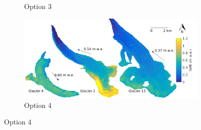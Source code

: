 \documentclass{sfuthesis}
\begin{document}
\begin{figure}[H]
\begin{subfigure}[b]{0.475\textwidth}
            \caption[]%
            {{\small Option 3}}    
        \end{subfigure}
        \quad
        \begin{subfigure}[b]{0.475\textwidth}   
            \centering 
            \includegraphics[width=\textwidth]{BMSmap_Modelled_Observed_Opt4.png}
            \caption[]%
            {{\small Option 4}}    
        \end{subfigure}
        

\end{figure}
\end{document}
